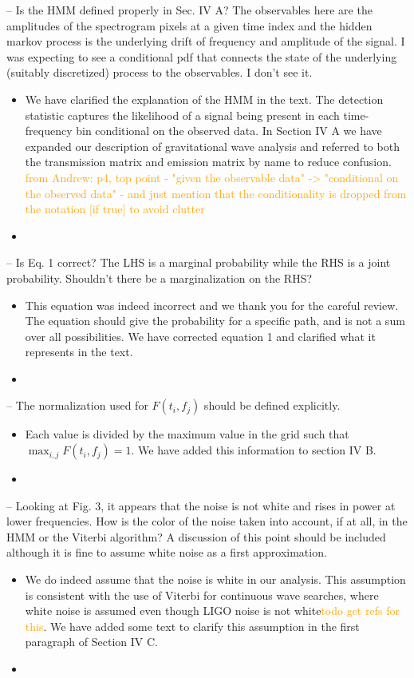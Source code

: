 \documentclass{article}
\newcommand{\han}{\textcolor{orange}}
\begin{document}
\noindent
-- Is the HMM defined properly in Sec. IV A? The observables here are the amplitudes of the spectrogram pixels at a given time index and the hidden markov process is the underlying drift of frequency and amplitude of the signal. I was expecting to see a conditional pdf that connects the state of the underlying (suitably discretized) process to the observables. I don't see it.
\begin{itemize}
\item We have clarified the explanation of the HMM in the text. The detection statistic captures the likelihood of a signal being present in each time-frequency bin conditional on the observed data. In Section IV A we have expanded our description of gravitational wave analysis and referred to both the transmission matrix and emission matrix by name to reduce confusion. \han{from Andrew: p4, top point - "given the observable data" -> "conditional on the observed data" - and just mention that the conditionality is dropped from the notation [if true] to avoid clutter}
\item[]
\end{itemize}

\noindent
-- Is Eq. 1 correct? The LHS is a marginal probability while the RHS is a joint probability. Shouldn't there be a marginalization on the RHS?
\begin{itemize}
\item This equation was indeed incorrect and we thank you for the careful review. The equation should give the probability for a specific path, and is not a sum over all possibilities. We have corrected equation 1 and clarified what it represents in the text.
\item[]
\end{itemize}

\noindent
-- The normalization used for $F(t_i, f_j)$ should be defined explicitly. 
\begin{itemize}
\item Each value is divided by the maximum value in the grid such that $\max_{i,j} F(t_i, f_j) = 1$. We have added this information to section IV B.
\item[]
\end{itemize}

\noindent
-- Looking at Fig. 3, it appears that the noise is not white and rises in power at lower frequencies. How is the color of the noise taken into account, if at all, in the HMM or the Viterbi algorithm? A discussion of this point should be included although it is fine to assume white noise as a first approximation. 
\begin{itemize}
\item We do indeed assume that the noise is white in our analysis. This assumption is consistent with the use of Viterbi for continuous wave searches, where white noise is assumed even though LIGO noise is not white\han{todo get refs for this}. We have added some text to clarify this assumption in the first paragraph of Section IV C.
\item[]
\end{itemize}
\end{document}
